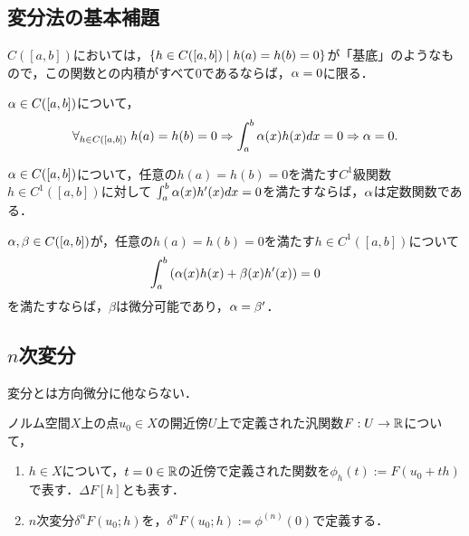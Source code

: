 \documentclass[uplatex,dvipdfmx]{jsreport}
\begin{document}
\subsection{変分法の基本補題}

\begin{tcolorbox}[colframe=ForestGreen, colback=ForestGreen!10!white,breakable,colbacktitle=ForestGreen!40!white,coltitle=black,fonttitle=\bfseries\sffamily,
title=]
    $C([a,b])$においては，$\left\{h\in C([a,b])\mid h(a)=h(b)=0\right\}$が「基底」のようなもので，この関数との内積がすべて$0$であるならば，$\alpha=0$に限る．
\end{tcolorbox}

\begin{lemma}
    $\alpha\in C([a,b])$について，
    \[\forall_{h\in C([a,b])}\;h(a)=h(b)=0\Rightarrow\int^b_a\alpha(x)h(x)dx=0\Rightarrow\alpha=0.\]
\end{lemma}

\begin{lemma}
    $\alpha\in C([a,b])$について，任意の$h(a)=h(b)=0$を満たす$C^1$級関数$h\in C^1([a,b])$に対して
    $\int^b_a\alpha(x)h'(x)dx=0$を満たすならば，$\alpha$は定数関数である．
\end{lemma}

\begin{lemma}[部分積分の公式の逆]
    $\alpha,\beta\in C([a,b])$が，任意の$h(a)=h(b)=0$を満たす$h\in C^1([a,b])$について
    \[\int^b_a\left(\alpha(x)h(x)+\beta(x)h'(x)\right)=0\]
    を満たすならば，$\beta$は微分可能であり，$\alpha=\beta'$．
\end{lemma}

\subsection{$n$次変分}

\begin{tcolorbox}[colframe=ForestGreen, colback=ForestGreen!10!white,breakable,colbacktitle=ForestGreen!40!white,coltitle=black,fonttitle=\bfseries\sffamily,
title=]
    変分とは方向微分に他ならない．
\end{tcolorbox}

\begin{definition}[$n$-th variation]
    ノルム空間$X$上の点$u_0\in X$の開近傍$U$上で定義された汎関数$F:U\to\mathbb{R}$について，
    \begin{enumerate}
        \item $h\in X$について，$t=0\in\mathbb{R}$の近傍で定義された関数を$\phi_h(t):=F(u_0+th)$で表す．$\Delta F[h]$とも表す．
        \item $n$次変分$\delta^nF(u_0;h)$を，$\delta^nF(u_0;h):=\phi^{(n)}(0)$で定義する．
    \end{enumerate}
\end{definition}
\end{document}
